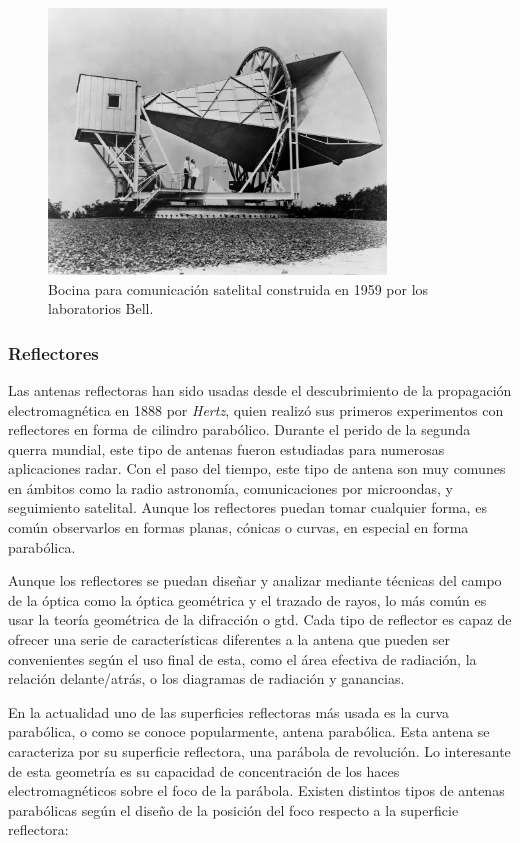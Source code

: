 \begin{figure}[h]
    \centering
        \includegraphics[width=0.8\textwidth]{archivos/horn}
        \caption{Bocina para comunicación satelital construida en 1959 por los laboratorios Bell. \citep{NASA1962}}
        \label{fig:horn}
\end{figure}

\subsubsection{Reflectores}

\par Las antenas reflectoras han sido usadas desde el descubrimiento de la propagación electromagnética en 1888 por \textit{Hertz}, quien realizó sus primeros experimentos con reflectores en forma de cilindro parabólico. Durante el perido de la segunda querra mundial, este tipo de antenas fueron estudiadas para numerosas aplicaciones radar. Con el paso del tiempo, este tipo de antena son muy comunes en ámbitos como la radio astronomía, comunicaciones por microondas, y seguimiento satelital. Aunque los reflectores puedan tomar cualquier forma, es común observarlos en formas planas, cónicas o curvas, en especial en forma parabólica. 
\\
\par Aunque los reflectores se puedan diseñar y analizar mediante técnicas del campo de la óptica como la óptica geométrica y el trazado de rayos, lo más común es usar la teoría geométrica de la difracción o \gls{gtd}. Cada tipo de reflector es capaz de ofrecer una serie de características diferentes a la antena que pueden ser convenientes según el uso final de esta, como el área efectiva de radiación, la relación delante/atrás, o los diagramas de radiación y ganancias.
\\
\par En la actualidad uno de las superficies reflectoras más usada es la curva parabólica, o como se conoce popularmente, antena parabólica. Esta antena se caracteriza por su superficie reflectora, una parábola de revolución. Lo interesante de esta geometría es su capacidad de concentración de los haces electromagnéticos sobre el foco de la parábola. Existen distintos tipos de antenas parabólicas según el diseño de la posición del foco respecto a la superficie reflectora:

